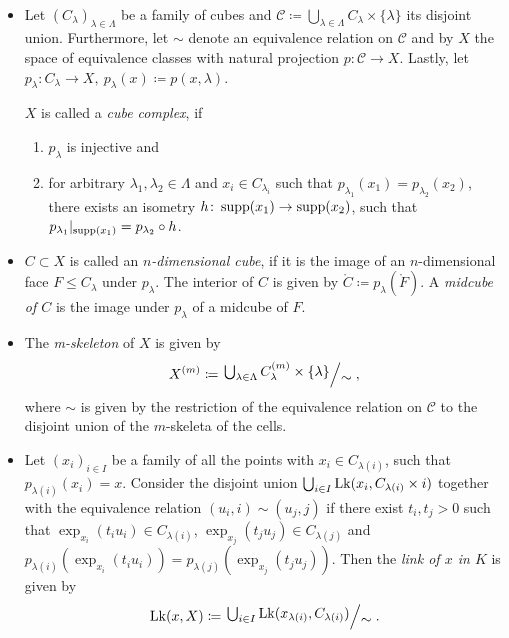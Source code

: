\begin{defin}\ 
  \begin{itemize}
  \item Let \((C_\lambda)_{\lambda \in \Lambda}\) be a family of cubes and \(\mathcal{C} \coloneqq \bigcup_{\lambda \in \Lambda} C_\lambda \times \{\lambda\}\) its disjoint union. Furthermore, let \(\sim\) denote an equivalence relation on \(\mathcal{C}\) and by \(X\) the space of equivalence classes with natural projection \(p \colon \mathcal{C} \to X\). Lastly, let \(p_\lambda \colon C_\lambda \to X,\ p_\lambda(x) \coloneqq p(x, \lambda)\).

    \(X\) is called a \emph{cube complex}, if
    \begin{enumerate}
    \item \(p_\lambda\) is injective and
    \item for arbitrary \(\lambda_1, \lambda_2 \in \Lambda\) and \(x_i \in C_{\lambda_i}\) such that \(p_{\lambda_1}(x_1) = p_{\lambda_2}(x_2)\), there exists an isometry \(h\colon \operatorname{supp}(x_1) \to \operatorname{supp}(x_2)\), such that \(p_{\lambda_1}|_{\operatorname{supp}(x_1)} = p_{\lambda_2} \circ h\).
    \end{enumerate}
  \item \(C \subset X\) is called an \emph{\(n\)-dimensional cube}, if it is the image of an \(n\)-dimensional face \(F \leq C_\lambda\) under \(p_\lambda\). The interior of \(C\) is given by \(\mathring C \coloneqq p_\lambda(\mathring F)\). A \emph{midcube of \(C\)} is the image under \(p_\lambda\) of a midcube of \(F\).
  \item The \emph{m-skeleton} of \(X\) is given by
    \begin{align*}
      X^{(m)} \coloneqq \quot{\bigcup_{\lambda \in \Lambda} C_\lambda^{(m)} \times \{\lambda\}}{\sim},
    \end{align*}
    where \(\sim\) is given by the restriction of the equivalence relation on \(\mathcal{C}\) to the disjoint union of the \(m\)-skeleta of the cells.

  \item Let \((x_i)_{i \in I}\) be a family of all the points with \(x_i \in C_{\lambda(i)}\), such that \(p_{\lambda(i)}(x_i) = x\). Consider the disjoint union \(\bigcup_{i \in I} \operatorname{Lk}(x_i, C_{\lambda(i)} \times {i})\) together with the equivalence relation \((u_i, i) \sim (u_j, j)\) if there exist \(t_i, t_j > 0\) such that \(\exp_{x_i}(t_i u_i) \in C_{\lambda(i)}\), \(\exp_{x_j}(t_j u_j) \in C_{\lambda(j)}\) and \(p_{\lambda(i)}(\exp_{x_i}(t_i u_i)) = p_{\lambda(j)}(\exp_{x_j}(t_j u_j))\). Then the \emph{link of \(x\) in \(K\)} is given by
    \begin{align*}
      \lk(x, X) \coloneqq \quot{\bigcup_{i \in I} \lk(x_{\lambda(i)}, C_{\lambda(i)})}{\sim}.
    \end{align*}
  \end{itemize}
\end{defin}

